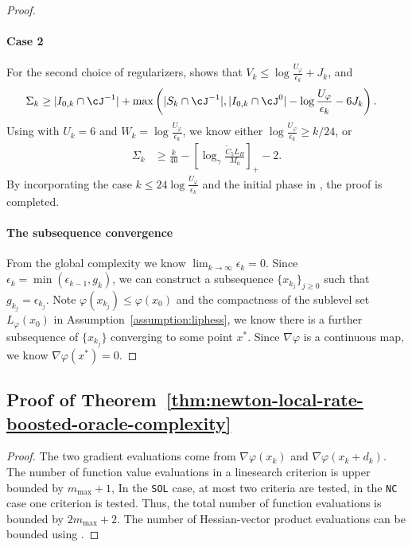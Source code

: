 \begin{proof}
    \paragraph{Case 2}
    For the second choice of regularizers,
     shows that $V_k \leq \log\frac{U_\varphi}{\epsilon_k} + J_k$, and 
    \begin{align*}
       \Sigma_k &\geq 
       |I_{0,k}\cap \cJ^{-1}|
       + 
       \max \left ( 
        |S_k \cap \cJ^{-1}|,  
        |I_{0,k}
        \cap \cJ^0| 
        - \log\frac{U_\varphi}{\epsilon_k}
        - 6J_k
        \right ).
    \end{align*}
    Using  with $U_k = 6$ and $W_k = \log \frac{U_\varphi}{\epsilon_k}$, we know either $\log \frac{U_\varphi}{\epsilon_k} \geq k / 24$, or 
    \begin{align*}
        \Sigma_k & \geq 
        \frac{k}{40}
      - \left[ \log_\gamma \frac{\tilde C_5 L_H}{M_0} \right]_+ - 2.
    \end{align*}
    By incorporating the case $k \leq 24 \log\frac{U_\varphi}{\epsilon_k}$ and the initial phase in , the proof is completed.

    \paragraph{The subsequence convergence}
    From the global complexity we know $\lim_{k \to \infty}\epsilon_k = 0$.
    Since $\epsilon_k = \min(\epsilon_{k-1}, g_k)$, we can construct a subsequence $\{ x_{k_j} \}_{j \geq 0}$ such that $g_{k_j} = \epsilon_{k_j}$.
    Note $\varphi(x_{k_j}) \leq \varphi(x_0)$ and the compactness of the sublevel set $L_\varphi(x_0)$ in Assumption~\ref{assumption:liphess}, we know there is a further subsequence of $\{ x_{k_j} \}$ converging to some point $x^*$.
    Since $\nabla\varphi$ is a continuous map, we know $\nabla\varphi(x^*) = 0$.
\end{proof}



\subsection{Proof of Theorem~\ref{thm:newton-local-rate-boosted-oracle-complexity}}\label{sec:appendix/oracle-complexity-proof}

\begin{proof}
The two gradient evaluations come from $\nabla \varphi(x_k)$ and $\nabla \varphi(x_k + d_k)$.
The number of function value evaluations in a linesearch criterion
is upper bounded by $m_{\mathrm{max}} + 1$, 
In the \texttt{SOL} case, at most two criteria are tested, in the \texttt{NC} case one criterion is tested.
Thus, the total number of function evaluations is bounded by $2m_{\mathrm{max}} + 2$.
The number of Hessian-vector product evaluations can be bounded using .
\end{proof}
